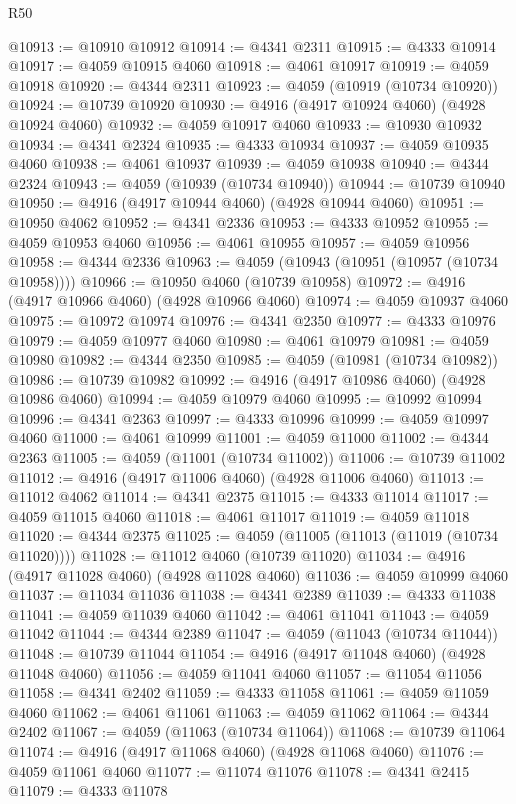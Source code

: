 \begin{lexlean}{R50}
\begin{coremodule}
@10913 := @10910 @10912
@10914 := @4341 @2311
@10915 := @4333 @10914
@10917 := @4059 @10915 @4060
@10918 := @4061 @10917
@10919 := @4059 @10918
@10920 := @4344 @2311
@10923 := @4059 (@10919 (@10734 @10920))
@10924 := @10739 @10920
@10930 := @4916 (@4917 @10924 @4060) (@4928 @10924 @4060)
@10932 := @4059 @10917 @4060
@10933 := @10930 @10932
@10934 := @4341 @2324
@10935 := @4333 @10934
@10937 := @4059 @10935 @4060
@10938 := @4061 @10937
@10939 := @4059 @10938
@10940 := @4344 @2324
@10943 := @4059 (@10939 (@10734 @10940))
@10944 := @10739 @10940
@10950 := @4916 (@4917 @10944 @4060) (@4928 @10944 @4060)
@10951 := @10950 @4062
@10952 := @4341 @2336
@10953 := @4333 @10952
@10955 := @4059 @10953 @4060
@10956 := @4061 @10955
@10957 := @4059 @10956
@10958 := @4344 @2336
@10963 := @4059 (@10943 (@10951 (@10957 (@10734 @10958))))
@10966 := @10950 @4060 (@10739 @10958)
@10972 := @4916 (@4917 @10966 @4060) (@4928 @10966 @4060)
@10974 := @4059 @10937 @4060
@10975 := @10972 @10974
@10976 := @4341 @2350
@10977 := @4333 @10976
@10979 := @4059 @10977 @4060
@10980 := @4061 @10979
@10981 := @4059 @10980
@10982 := @4344 @2350
@10985 := @4059 (@10981 (@10734 @10982))
@10986 := @10739 @10982
@10992 := @4916 (@4917 @10986 @4060) (@4928 @10986 @4060)
@10994 := @4059 @10979 @4060
@10995 := @10992 @10994
@10996 := @4341 @2363
@10997 := @4333 @10996
@10999 := @4059 @10997 @4060
@11000 := @4061 @10999
@11001 := @4059 @11000
@11002 := @4344 @2363
@11005 := @4059 (@11001 (@10734 @11002))
@11006 := @10739 @11002
@11012 := @4916 (@4917 @11006 @4060) (@4928 @11006 @4060)
@11013 := @11012 @4062
@11014 := @4341 @2375
@11015 := @4333 @11014
@11017 := @4059 @11015 @4060
@11018 := @4061 @11017
@11019 := @4059 @11018
@11020 := @4344 @2375
@11025 := @4059 (@11005 (@11013 (@11019 (@10734 @11020))))
@11028 := @11012 @4060 (@10739 @11020)
@11034 := @4916 (@4917 @11028 @4060) (@4928 @11028 @4060)
@11036 := @4059 @10999 @4060
@11037 := @11034 @11036
@11038 := @4341 @2389
@11039 := @4333 @11038
@11041 := @4059 @11039 @4060
@11042 := @4061 @11041
@11043 := @4059 @11042
@11044 := @4344 @2389
@11047 := @4059 (@11043 (@10734 @11044))
@11048 := @10739 @11044
@11054 := @4916 (@4917 @11048 @4060) (@4928 @11048 @4060)
@11056 := @4059 @11041 @4060
@11057 := @11054 @11056
@11058 := @4341 @2402
@11059 := @4333 @11058
@11061 := @4059 @11059 @4060
@11062 := @4061 @11061
@11063 := @4059 @11062
@11064 := @4344 @2402
@11067 := @4059 (@11063 (@10734 @11064))
@11068 := @10739 @11064
@11074 := @4916 (@4917 @11068 @4060) (@4928 @11068 @4060)
@11076 := @4059 @11061 @4060
@11077 := @11074 @11076
@11078 := @4341 @2415
@11079 := @4333 @11078

\end{coremodule}
\end{lexlean}
